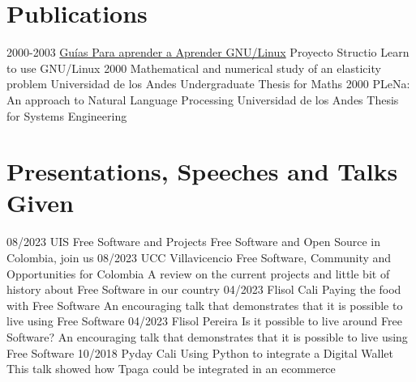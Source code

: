 \section{Publications}
\begin{entrylist}
  \entry
    {2000-2003}
    {\href{http://structio.sourceforge.net/guias/AA_Linux_colegio/AA_Linux_colegio.html}{Guías Para aprender a Aprender GNU/Linux}}
    {Proyecto Structio}
    {Learn to use GNU/Linux}
  \entry
    {2000}
    {Mathematical and numerical study of an
    elasticity problem}
    {Universidad de los Andes}
    {Undergraduate Thesis for Maths}
  \entry
    {2000}
    {PLeNa: An approach to Natural Language
    Processing}
    {Universidad de los Andes}
    {Thesis for Systems Engineering}
\end{entrylist}

\section{Presentations, Speeches and Talks Given}
\begin{entrylist}
  \entry
    {08/2023}
    {UIS}
    {Free Software and Projects}
    {Free Software and Open Source in Colombia, join us}
  \entry
      {08/2023}
      {UCC Villavicencio}
    {Free Software, Community and Opportunities for Colombia}
    {A review on the current projects and little bit of history about Free Software in our country}
  \entry
    {04/2023}
    {Flisol Cali}
    {Paying the food with Free Software}
    {An encouraging talk that demonstrates that it is possible to live using Free Software}
  \entry
    {04/2023}
    {Flisol Pereira}
    {Is it possible to live around Free Software?}
    {An encouraging talk that demonstrates that it is possible to live using Free Software}
  \entry
    {10/2018}
    {Pyday Cali}
    {Using Python to integrate a Digital Wallet}
    {This talk showed how Tpaga could be integrated in an ecommerce}
\end{entrylist}
